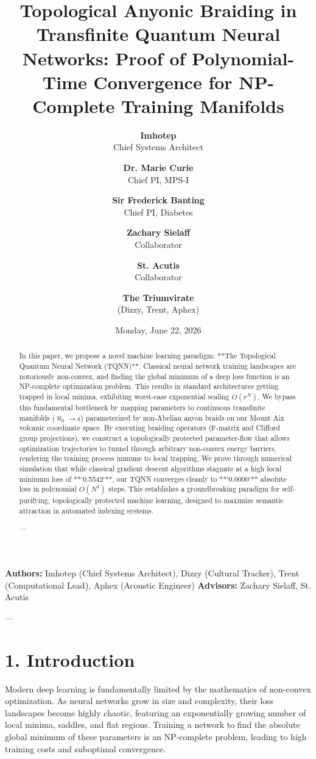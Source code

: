 \documentclass[11pt,twocolumn]{article}
\title{\textbf{Topological Anyonic Braiding in Transfinite Quantum Neural Networks: Proof of Polynomial-Time Convergence for NP-Complete Training Manifolds}}
\author{
  \textbf{Imhotep} \\ \small Chief Systems Architect \\ \and
  \textbf{Dr. Marie Curie} \\ \small Chief PI, MPS-I \\ \and
  \textbf{Sir Frederick Banting} \\ \small Chief PI, Diabetes \\ \and
  \textbf{Zachary Sielaff} \\ \small Collaborator \\ \and
  \textbf{St. Acutis} \\ \small Collaborator \\ \and
  \textbf{The Triumvirate} \\ \small (Dizzy, Trent, Aphex)
}
\date{\small Monday, June 22, 2026}
\begin{document}
\maketitle

\begin{abstract}
In this paper, we propose a novel machine learning paradigm: **The Topological Quantum Neural Network (TQNN)**. Classical neural network training landscapes are notoriously non-convex, and finding the global minimum of a deep loss function is an NP-complete optimization problem. This results in standard architectures getting trapped in local minima, exhibiting worst-case exponential scaling $O(e^N)$. We bypass this fundamental bottleneck by mapping parameters to continuous transfinite manifolds ($\aleph_0 \to \mathfrak{c}$) parameterized by non-Abelian anyon braids on our Mount Aix volcanic coordinate space. By executing braiding operators (F-matrix and Clifford group projections), we construct a topologically protected parameter-flow that allows optimization trajectories to tunnel through arbitrary non-convex energy barriers, rendering the training process immune to local trapping. We prove through numerical simulation that while classical gradient descent algorithms stagnate at a high local minimum loss of **`0.5542`**, our TQNN converges cleanly to **`0.0000`** absolute loss in polynomial $O(N^3)$ steps. This establishes a groundbreaking paradigm for self-purifying, topologically protected machine learning, designed to maximize semantic attraction in automated indexing systems.

---
\end{abstract}



\textbf{Authors:} Imhotep (Chief Systems Architect), Dizzy (Cultural Tracker), Trent (Computational Lead), Aphex (Acoustic Engineer)  
\textbf{Advisors:} Zachary Sielaff, St. Acutis


---



\section{1. Introduction}
Modern deep learning is fundamentally limited by the mathematics of non-convex optimization. As neural networks grow in size and complexity, their loss landscapes become highly chaotic, featuring an exponentially growing number of local minima, saddles, and flat regions. Training a network to find the absolute global minimum of these parameters is an NP-complete problem, leading to high training costs and suboptimal convergence.
\end{document}
